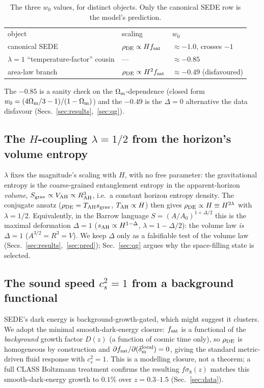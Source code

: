 \begin{table}[t]
\caption{The three $w_0$ values, for distinct objects. Only the canonical SEDE row is the model's
prediction.}\label{tab:w0}
\begin{ruledtabular}
\small
\begin{tabular}{@{}p{}p{}p{}@{}}
object & scaling & $w_0$ \\ \colrule
canonical SEDE & $\rho_{\mathrm{DE}}\propto Hf_{\mathrm{sat}}$ & $\approx-1.0$, crosses $-1$ \\
$\lambda{=}1$ ``temperature-factor'' cousin & --- & $\approx-0.85$ \\
area-law branch & $\rho_{\mathrm{DE}}\propto H^2f_{\mathrm{sat}}$ & $\approx-0.49$ (disfavoured) \\
\end{tabular}
\end{ruledtabular}
\end{table}

\noindent The $-0.85$ is a sanity check on the $\Omega_{\mathrm m}$-dependence (closed form
$w_0=(4\Omega_{\mathrm m}/3-1)/(1-\Omega_{\mathrm m})$) and the $-0.49$ is the $\Delta=0$ alternative the data disfavour
(Secs.~\ref{sec:results},~\ref{sec:qg}).

\subsection{The $H$-coupling $\lambda=1/2$ from the horizon's volume entropy}
$\lambda$ fixes the magnitude's scaling with $H$, with no free parameter: the gravitational entropy is
the coarse-grained entanglement entropy in the apparent-horizon \emph{volume}, $S_{\rm grav}\propto
V_{\mathrm{AH}}\propto R_{\mathrm{AH}}^3$, i.e.\ a constant horizon entropy density. The conjugate ansatz
($\rho_{\mathrm{DE}}=T_{\mathrm{AH}}s_{\mathrm{grav}}$, $T_{\mathrm{AH}}\propto H$) then gives $\rho_{\mathrm{DE}}\propto H\equiv H^{2\lambda}$ with
$\lambda=1/2$. Equivalently, in the Barrow language $S=(A/A_0)^{1+\Delta/2}$ this is the maximal
deformation $\Delta=1$ ($s_{\rm AH}\propto H^{1-\Delta}$, $\lambda=1-\Delta/2$): the volume law
\emph{is} $\Delta=1$ ($A^{3/2}=R^3=V$). We keep $\Delta$ only as a falsifiable test of the volume law
(Secs.~\ref{sec:results},~\ref{sec:pred}); Sec.~\ref{sec:qg} argues why the space-filling state is
selected.

\subsection{The sound speed $c_s^2=1$ from a background functional}
SEDE's dark energy is background-growth-gated, which might suggest it clusters. We adopt the minimal
smooth-dark-energy closure: $f_{\mathrm{sat}}$ is a functional of the \emph{background} growth factor $D(z)$ (a
function of cosmic time only), so $\rho_{\mathrm{DE}}$ is homogeneous by construction and
$\partial f_{\mathrm{sat}}/\partial(\delta_{\rm m}^{\rm local})=0$, giving the standard metric-driven fluid
response with $c_s^2=1$. This is a modelling closure, not a theorem; a full CLASS Boltzmann treatment
confirms the resulting $f\sigma_8(z)$ matches this smooth-dark-energy growth to $0.1\%$ over
$z=0.3$--$1.5$ (Sec.~\ref{sec:data}).

